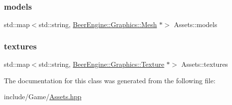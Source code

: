 \mbox{\label{class_assets_a83d7f0d79376b56cf2c3ca78d4f01df4}} 
\subsubsection{\texorpdfstring{models}{models}}
{\footnotesize\ttfamily std\+::map$<$std\+::string, \mbox{\hyperlink{class_beer_engine_1_1_graphics_1_1_mesh}{Beer\+Engine\+::\+Graphics\+::\+Mesh}} $\ast$$>$ Assets\+::models}

\mbox{\label{class_assets_a973029267b9ab6da8c326f2f7b1404c2}} 
\subsubsection{\texorpdfstring{textures}{textures}}
{\footnotesize\ttfamily std\+::map$<$std\+::string, \mbox{\hyperlink{class_beer_engine_1_1_graphics_1_1_texture}{Beer\+Engine\+::\+Graphics\+::\+Texture}} $\ast$$>$ Assets\+::textures}



The documentation for this class was generated from the following file\+:\begin{DoxyCompactItemize}
\item 
include/\+Game/\mbox{\hyperlink{_assets_8hpp}{Assets.\+hpp}}\end{DoxyCompactItemize}

